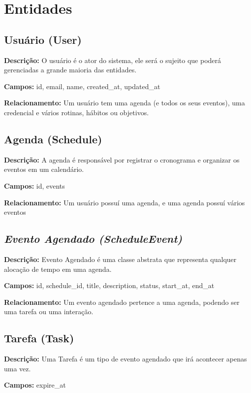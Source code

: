 \chapter{Entidades}

\section{Usuário (User)}

\textbf{Descrição:} O usuário é o ator do sistema, ele será o sujeito que poderá gerenciadas a grande
maioria das entidades.

\textbf{Campos:} id, email, name, created\_at, updated\_at

\textbf{Relacionamento:} Um usuário tem uma agenda (e todos os seus eventos), uma credencial e vários rotinas, hábitos ou objetivos.

\section{Agenda (Schedule)}

\textbf{Descrição:} A agenda é responsável por registrar o cronograma e organizar os eventos em um calendário.

\textbf{Campos:} id, events

\textbf{Relacionamento:} Um usuário possuí uma agenda, e uma agenda possuí vários eventos

\section{\textit{Evento Agendado (ScheduleEvent)}}

\textbf{Descrição:} Evento Agendado é uma classe abstrata que representa qualquer alocação de tempo em uma agenda.

\textbf{Campos:} id, schedule\_id, title, description, status, start\_at, end\_at

\textbf{Relacionamento:} Um evento agendado pertence a uma agenda, podendo ser uma tarefa ou uma interação.

\section{Tarefa (Task)}

\textbf{Descrição:} Uma Tarefa é um tipo de evento agendado que irá acontecer apenas uma vez.

\textbf{Campos:} expire\_at

